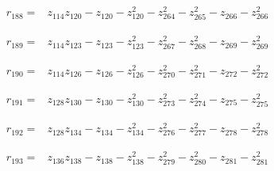 \par\noindent\begin{minipage}{\linewidth}
\begin{align*}
r_{188}={}&z_{114}z_{120}-z_{120}-z_{120}^{2}-z_{264}^{2}-z_{265}^{2}-z_{266}-z_{266}^{2}
\end{align*}
\end{minipage}\par
\par\noindent\begin{minipage}{\linewidth}
\begin{align*}
r_{189}={}&z_{114}z_{123}-z_{123}-z_{123}^{2}-z_{267}^{2}-z_{268}^{2}-z_{269}-z_{269}^{2}
\end{align*}
\end{minipage}\par
\par\noindent\begin{minipage}{\linewidth}
\begin{align*}
r_{190}={}&z_{114}z_{126}-z_{126}-z_{126}^{2}-z_{270}^{2}-z_{271}^{2}-z_{272}-z_{272}^{2}
\end{align*}
\end{minipage}\par
\par\noindent\begin{minipage}{\linewidth}
\begin{align*}
r_{191}={}&z_{128}z_{130}-z_{130}-z_{130}^{2}-z_{273}^{2}-z_{274}^{2}-z_{275}-z_{275}^{2}
\end{align*}
\end{minipage}\par
\par\noindent\begin{minipage}{\linewidth}
\begin{align*}
r_{192}={}&z_{128}z_{134}-z_{134}-z_{134}^{2}-z_{276}^{2}-z_{277}^{2}-z_{278}-z_{278}^{2}
\end{align*}
\end{minipage}\par
\par\noindent\begin{minipage}{\linewidth}
\begin{align*}
r_{193}={}&z_{136}z_{138}-z_{138}-z_{138}^{2}-z_{279}^{2}-z_{280}^{2}-z_{281}-z_{281}^{2}
\end{align*}
\end{minipage}\par
